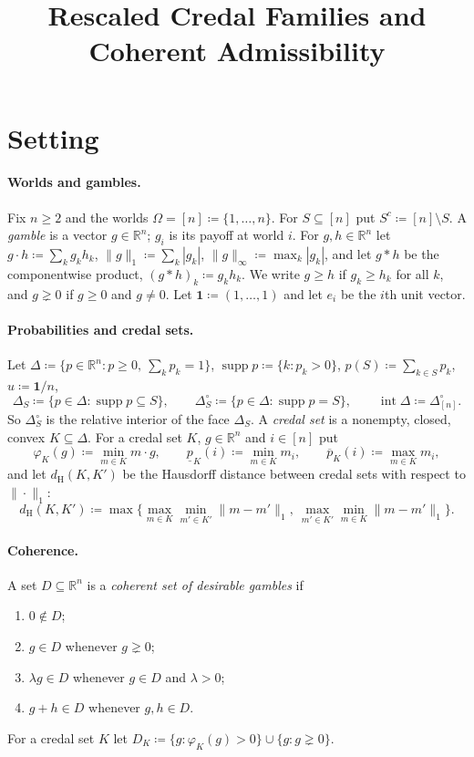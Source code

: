 \documentclass[11pt]{article}
\title{Rescaled Credal Families and Coherent Admissibility}
\author{}
\date{}
\theoremstyle{definition}
\newcommand{\R}{\mathbb R}
\newcommand{\one}{\mathbf 1}
\newcommand{\supp}{\operatorname{supp}}
\newcommand{\dH}{d_{\mathrm H}}
\newcommand{\lp}{\underline{p}}
\newcommand{\up}{\overline{p}}
\newcommand{\gneqz}{\gneq 0}
\begin{document}
\maketitle

\section{Setting}\label{sec:setting}

\paragraph{Worlds and gambles.}
Fix $n\ge2$ and the worlds $\Omega=[n]\coloneqq\{1,\dots,n\}$. For $S\subseteq[n]$ put $S^c\coloneqq[n]\setminus S$. A \emph{gamble} is a vector $g\in\R^n$; $g_i$ is its payoff at world $i$. For $g,h\in\R^n$ let $g\cdot h\coloneqq\sum_kg_kh_k$, $\|g\|_1\coloneqq\sum_k|g_k|$, $\|g\|_\infty\coloneqq\max_k|g_k|$, and let $g*h$ be the componentwise product, $(g*h)_k\coloneqq g_kh_k$. We write $g\ge h$ if $g_k\ge h_k$ for all $k$, and $g\gneqz$ if $g\ge0$ and $g\ne0$. Let $\one\coloneqq(1,\dots,1)$ and let $e_i$ be the $i$th unit vector.

\paragraph{Probabilities and credal sets.}
Let $\Delta\coloneqq\{p\in\R^n:p\ge0,\ \sum_kp_k=1\}$, $\supp p\coloneqq\{k:p_k>0\}$, $p(S)\coloneqq\sum_{k\in S}p_k$, $u\coloneqq\one/n$,
\[
\Delta_S\coloneqq\{p\in\Delta:\supp p\subseteq S\},\qquad \Delta^\circ_S\coloneqq\{p\in\Delta:\supp p=S\},\qquad \operatorname{int}\Delta\coloneqq\Delta^\circ_{[n]}.
\]
So $\Delta^\circ_S$ is the relative interior of the face $\Delta_S$. A \emph{credal set} is a nonempty, closed, convex $K\subseteq\Delta$. For a credal set $K$, $g\in\R^n$ and $i\in[n]$ put
\[
\varphi_K(g)\coloneqq\min_{m\in K}m\cdot g,\qquad \lp_K(i)\coloneqq\min_{m\in K}m_i,\qquad \up_K(i)\coloneqq\max_{m\in K}m_i ,
\]
and let $\dH(K,K')$ be the Hausdorff distance between credal sets with respect to $\|\cdot\|_1$:
\[
\dH(K,K')\coloneqq\max\Big\{\max_{m\in K}\min_{m'\in K'}\|m-m'\|_1,\ \max_{m'\in K'}\min_{m\in K}\|m-m'\|_1\Big\}.
\]

\paragraph{Coherence.}
A set $D\subseteq\R^n$ is a \emph{coherent set of desirable gambles} if
\begin{enumerate}[label=(D\arabic*),leftmargin=3em]
\item $0\notin D$;
\item $g\in D$ whenever $g\gneqz$;
\item $\lambda g\in D$ whenever $g\in D$ and $\lambda>0$;
\item $g+h\in D$ whenever $g,h\in D$.
\end{enumerate}
For a credal set $K$ let $D_K\coloneqq\{g:\varphi_K(g)>0\}\cup\{g:g\gneqz\}$.
\end{document}
